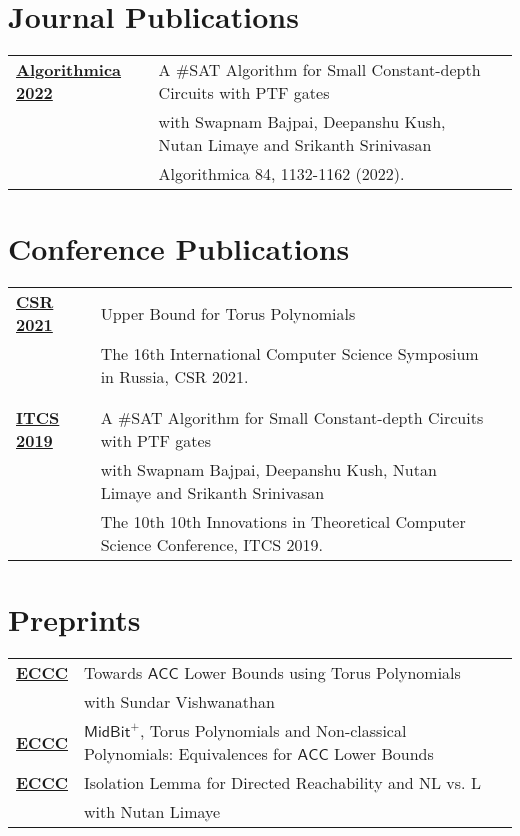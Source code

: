 \documentclass[a4paper,10pt]{article}
\begin{document}
\section{Journal Publications}

\begin{tabular}{p{2.5cm}|p{11cm}l}
  \href{https://link.springer.com/article/10.1007/s00453-021-00915-7}{{\bf Algorithmica 2022}} & A \#SAT Algorithm for Small Constant-depth Circuits with PTF gates \\
  & with Swapnam Bajpai, Deepanshu Kush, Nutan Limaye and Srikanth Srinivasan \\
  & Algorithmica 84, 1132-1162 (2022).
\end{tabular}

\section{Conference Publications}

\begin{tabular}{p{2.5cm}|p{11cm}l}
  \href{https://link.springer.com/chapter/10.1007/978-3-030-79416-3_15}{{\bf CSR 2021}} & Upper Bound for Torus Polynomials \\
  & The 16th International Computer Science Symposium in Russia, CSR 2021. \\\multicolumn{2}{c}{} \\
  \\
  \href{https://drops.dagstuhl.de/opus/volltexte/2018/10101/}{{\bf ITCS 2019}} & A \#SAT Algorithm for Small Constant-depth Circuits with PTF gates \\
  & with Swapnam Bajpai, Deepanshu Kush, Nutan Limaye and Srikanth Srinivasan \\
  & The 10th 10th Innovations in Theoretical Computer Science Conference, ITCS 2019.
\end{tabular}

\section{Preprints}

\begin{tabular}{p{2.5cm}|p{11cm}l}
  \href{https://eccc.weizmann.ac.il/report/2024/074/}{{\bf ECCC}} & Towards \(\mathsf{ACC}\) Lower Bounds using Torus Polynomials \\
                                                                  & with Sundar Vishwanathan \\
  \href{https://eccc.weizmann.ac.il/report/2023/111/}{{\bf ECCC}} & \(\mathsf{MidBit}^+\), Torus Polynomials and Non-classical Polynomials: Equivalences for \(\mathsf{ACC}\) Lower Bounds \\
  \href{https://eccc.weizmann.ac.il/report/2016/155/}{{\bf ECCC}} & Isolation Lemma for Directed Reachability and NL vs. L
  \\
  & with Nutan Limaye
\end{tabular}
\end{document}
